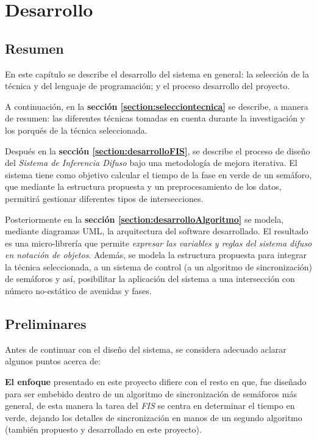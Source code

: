 \chapter{Desarrollo}
\section{Resumen}
En este capítulo se describe el desarrollo del sistema en general: la selección de la técnica y del lenguaje de programación; y el proceso desarrollo del proyecto.

A continuación, en la \textbf{sección \ref{section:selecciontecnica}} se describe, a manera de resumen: las diferentes técnicas tomadas en cuenta durante la investigación y los porqués de la técnica seleccionada.

Después en la \textbf{sección \ref{section:desarrolloFIS}}, se describe el proceso de diseño del \textit{Sistema de Inferencia Difuso} bajo una metodología de mejora iterativa. El sistema tiene como objetivo calcular el tiempo de la fase en verde de un semáforo, que mediante la estructura propuesta y un preprocesamiento de los datos, permitirá gestionar diferentes tipos de intersecciones.

Posteriormente en la \textbf{sección \ref{section:desarrolloAlgoritmo}} se modela, mediante diagramas UML, la arquitectura del software desarrollado. El resultado es una micro-librería que permite \emph{expresar las variables y reglas del sistema difuso en notación de objetos}. Además, se modela la estructura propuesta para integrar la técnica seleccionada, a un sistema de control (a un algoritmo de sincronización) de semáforos y así, posibilitar la aplicación del sistema a una intersección con número no-estático de avenidas y fases.

\section{Preliminares}
Antes de continuar con el diseño del sistema, se considera adecuado aclarar algunos puntos acerca de:

\textbf{El enfoque} presentado en este proyecto difiere con el resto en que, fue diseñado para ser embebido dentro de un algoritmo de sincronización de semáforos más general, de esta manera la tarea del \textit{FIS} se centra en determinar el tiempo en verde, dejando los detalles de sincronización en manos de un segundo algoritmo (también propuesto y desarrollado en este proyecto).



